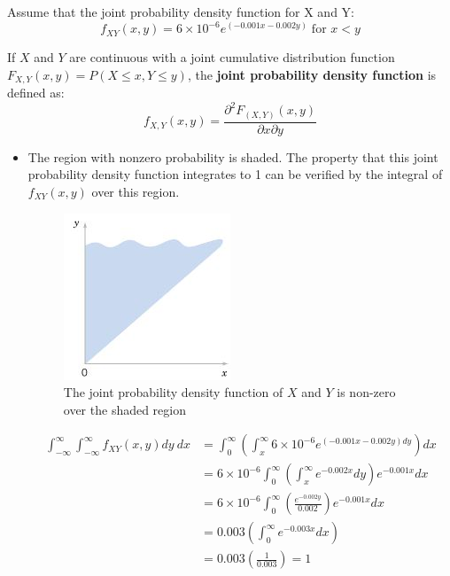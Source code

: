 \documentclass[10pt,a4paper]{article}
\begin{document}
Assume that the joint probability density function for X and Y:
$$
f_{XY}(x,y) = 6 \times 10^{-6} e^{(-0.001x - 0.002y)} \; \text{for } x<y
$$


If $X$ and $Y$ are continuous with a joint cumulative distribution function $F_{X,Y}(x,y)=P(X\leq x,
Y\leq y)$, the \textbf{joint probability density function} is defined as:
$$
    f_{X,Y}(x,y) = \frac{\partial^2 F_(X,Y)(x,y)}{\partial x \partial y}
$$
\begin{itemize}
    \item The region with nonzero probability is shaded. The property that this joint
    probability density function integrates to 1 can be veriﬁed by the integral of $f_{XY}(x, y)$ over this
    region.
    \begin{figure} [h!]
        \centering
        \includegraphics[scale=0.7]{Ex1.JPG}
        \caption{The joint probability density function of $X$ and $Y$ is non-zero over the shaded region}
    \end{figure}
    \begin{align*}
        \int_{-\infty}^\infty \int_{-\infty}^\infty f_{XY}(x,y)dy\: dx &= \int_0^\infty \left(\int_x^\infty 6 \times 10^{-6}e^{(-0.001x - 0.002y)dy}\right)dx \\
        &= 6 \times 10^{-6} \int_0^\infty \left(\int_x^\infty e^{-0.002x}dy\right)e^{-0.001x}dx \\
        &= 6 \times 10^{-6} \int_0^\infty \left(\frac{e^{-0.002y}}{0.002}\right)e^{-0.001x}dx \\
        &= 0.003\left(\int_0^\infty e^{-0.003x}dx\right) \\
        &= 0.003\left(\frac{1}{0.003}\right) = 1
    \end{align*}


\end{itemize}
\end{document}
